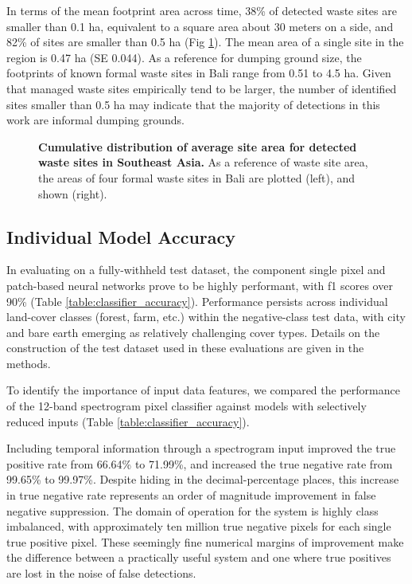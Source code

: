 \documentclass[10pt,letterpaper]{article}
\begin{document}
In terms of the mean footprint area across time, 38\% of detected waste sites are smaller than 0.1 ha, equivalent to a square area about 30 meters on a side, and 82\% of sites are smaller than 0.5 ha (Fig \ref{fig:site_areas}). The mean area of a single site in the region is 0.47 ha (SE 0.044). As a reference for dumping ground size, the footprints of known formal waste sites in Bali range from 0.51 to 4.5 ha. Given that managed waste sites empirically tend to be larger, the number of identified sites smaller than 0.5 ha may indicate that the majority of detections in this work are informal dumping grounds.

\begin{figure}[!h]
    \caption{{\bf Cumulative distribution of average site area for detected waste sites in Southeast Asia.}
    As a reference of waste site area, the areas of four formal waste sites in Bali are plotted (left), and shown (right).}
    \label{fig:site_areas}
\end{figure}

\subsection*{Individual Model Accuracy}\label{results:accuracy}
In evaluating on a fully-withheld test dataset, the component single pixel and patch-based neural networks prove to be highly performant, with f1 scores over 90\% (Table \ref{table:classifier_accuracy}). Performance persists across individual land-cover classes (forest, farm, etc.) within the negative-class test data, with city and bare earth emerging as relatively challenging cover types. Details on the construction of the test dataset used in these evaluations are given in the methods.

To identify the importance of input data features, we compared the performance of the 12-band spectrogram pixel classifier against models with selectively reduced inputs (Table \ref{table:classifier_accuracy}).

Including temporal information through a spectrogram input improved the true positive rate from 66.64\% to 71.99\%, and increased the true negative rate from 99.65\% to 99.97\%. Despite hiding in the decimal-percentage places, this increase in true negative rate represents an order of magnitude improvement in false negative suppression. The domain of operation for the system is highly class imbalanced, with approximately ten million true negative pixels for each single true positive pixel. These seemingly fine numerical margins of improvement make the difference between a practically useful system and one where true positives are lost in the noise of false detections.
\end{document}

